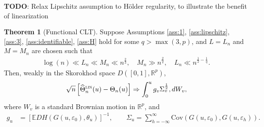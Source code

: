 \documentclass[10pt, a4paper]{article}
\theoremstyle{assumption}
\theoremstyle{definition}
\theoremstyle{theorem}
\newtheorem{theorem}{Theorem}[section]
\newcommand{\R}{\mathbb{R}}
\newcommand{\E}{\mathbb{E}}
\newcommand{\Cov}{\mathrm{Cov}}
\begin{document}
\color{blue} \textbf{TODO}: Relax Lipschitz assumption to Hölder regularity, to illustrate the benefit of linearization \color{black}


\begin{shaded}
\begin{theorem}[Functional CLT]\label{thm:FCLT-linearized}
    Suppose Assumptions \ref{ass:1}, \ref{ass:lipschitz}, \ref{ass:3}, \ref{ass:identifiable},  \ref{ass:H} hold for some $q> \max(3,p)$, and $L=L_n$ and $M=M_n$ are chosen such that
    \begin{align}
        \log(n)\ll L_n \ll M_n \ll n^{\frac{2}{3}}, \quad M_n\gg n^{\frac{2}{q}}, \quad L_n \ll n^{\frac{1}{2}-\frac{1}{q}}. \label{eqn:FCLT-rate}
    \end{align}
    Then, weakly in the Skorokhod space $D([0,1], \R^p)$,
    \begin{align*}
        \sqrt{n} \left[ \widehat{\Theta}_n^{\textsc{lin}}(u) - \Theta_n(u) \right] \Rightarrow \int_0^u g_v \Sigma_v^{\frac{1}{2}}, dW_v,
    \end{align*}
    where $W_v$ is a standard Brownian motion in $\R^p$, and 
    \begin{align*}
        g_u &= \left[\E D H \left(G(u, \varepsilon_0), \theta_u\right)\right]^{-1}, \qquad 
        \Sigma_u = \sum_{h=-\infty}^\infty \Cov\left( G(u, \varepsilon_0), G(u, \varepsilon_h)\right).
    \end{align*}
\end{theorem}
\end{shaded}
\end{document}
